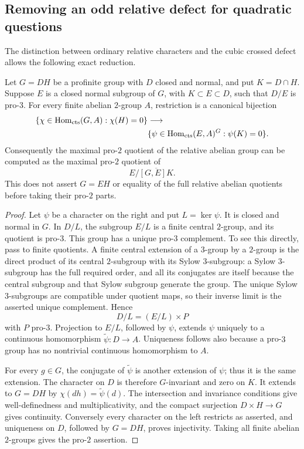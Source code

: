 \subsection{Removing an odd relative defect for quadratic questions}

The distinction between ordinary relative characters and the cubic
crossed defect allows the following exact reduction.

\begin{lemma}\label{lem:odd-relative-kernel}
Let \(G=DH\) be a profinite group with \(D\) closed and normal,
and put \(K=D\cap H\). Suppose \(E\) is a closed normal subgroup
of \(G\), with \(K\subset E\subset D\), such that \(D/E\) is
pro-\(3\). For every finite abelian \(2\)-group \(A\), restriction
is a canonical bijection
\[
 \begin{aligned}
 \{\chi\in\operatorname{Hom}_{\rm cts}(G,A):\chi(H)=0\}
 &\longrightarrow\\
 &\{\psi\in\operatorname{Hom}_{\rm cts}(E,A)^G:\psi(K)=0\}.
 \end{aligned}
\]
Consequently the maximal pro-\(2\) quotient of the relative
abelian group can be computed as the maximal pro-\(2\) quotient of
\[
                  E/\overline{[G,E]K}.
\]
This does not assert \(G=EH\) or equality of the full relative
abelian quotients before taking their pro-\(2\) parts.
\end{lemma}
\begin{proof}
Let \(\psi\) be a character on the right and put \(L=\ker\psi\).
It is closed and normal in \(G\). In \(D/L\), the subgroup
\(E/L\) is a finite central \(2\)-group, and its quotient is
pro-\(3\). This group has a unique pro-\(3\) complement.
To see this directly, pass to finite quotients. A finite
central extension of a \(3\)-group by a \(2\)-group is the
direct product of its central \(2\)-subgroup with its Sylow
\(3\)-subgroup: a Sylow \(3\)-subgroup has the full required
order, and all its conjugates are itself because the
central subgroup and that Sylow subgroup generate the group.
The unique Sylow \(3\)-subgroups are compatible under quotient
maps, so their inverse limit is the asserted unique complement.
Hence
\[
                    D/L=(E/L)\times P
\]
with \(P\) pro-\(3\). Projection to \(E/L\), followed by
\(\psi\), extends \(\psi\) uniquely to a continuous
homomorphism \(\widetilde\psi:D\to A\).
Uniqueness follows also because a pro-\(3\) group has no
nontrivial continuous homomorphism to \(A\).

For every \(g\in G\), the conjugate of
\(\widetilde\psi\) is another extension of \(\psi\);
thus it is the same extension. The character on \(D\)
is therefore \(G\)-invariant and zero on \(K\).
It extends to \(G=DH\) by
\(\chi(dh)=\widetilde\psi(d)\).
The intersection and invariance conditions give
well-definedness and multiplicativity, and the compact
surjection \(D\times H\to G\) gives continuity.
Conversely every character on the left restricts as
asserted, and uniqueness on \(D\), followed by \(G=DH\),
proves injectivity. Taking all finite abelian \(2\)-groups
gives the pro-\(2\) assertion.
\end{proof}

